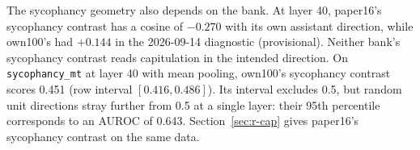The sycophancy geometry also depends on the bank. %
At layer 40, paper16's sycophancy contrast has a cosine of $-0.270$ with its own assistant direction, while own100's had $+0.144$ in the 2026-09-14 diagnostic (provisional). %
Neither bank's sycophancy contrast reads capitulation in the intended direction. %
On \texttt{sycophancy\_mt} at layer 40 with mean pooling, own100's sycophancy contrast scores 0.451 (row interval $[0.416, 0.486]$). %
Its interval excludes 0.5, but random unit directions stray further from 0.5 at a single layer: their 95th percentile corresponds to an AUROC of 0.643. %
Section~\ref{sec:r-cap} gives paper16's sycophancy contrast on the same data.

